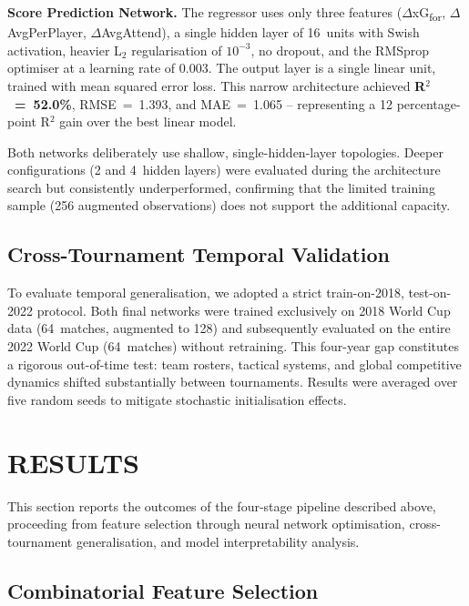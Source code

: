 \documentclass[a4paper,twoside]{article}
\begin{document}
\noindent\textbf{Score Prediction Network.}
The regressor uses only three features ($\Delta$xG\textsubscript{for}, $\Delta$AvgPerPlayer, $\Delta$AvgAttend), a single hidden layer of 16~units with Swish activation, heavier L$_{2}$ regularisation of $10^{-3}$, no dropout, and the RMSprop optimiser at a learning rate of 0.003.
The output layer is a single linear unit, trained with mean squared error loss.
This narrow architecture achieved \textbf{R$^{2}$~=~52.0\%}, RMSE~=~1.393, and MAE~=~1.065 -- representing a 12 percentage-point R$^{2}$ gain over the best linear model.

Both networks deliberately use shallow, single-hidden-layer topologies.
Deeper configurations (2 and 4~hidden layers) were evaluated during the architecture search but consistently underperformed, confirming that the limited training sample (256 augmented observations) does not support the additional capacity.

\subsection{Cross-Tournament Temporal Validation}

To evaluate temporal generalisation, we adopted a strict train-on-2018, test-on-2022 protocol.
Both final networks were trained exclusively on 2018 World Cup data (64~matches, augmented to 128) and subsequently evaluated on the entire 2022 World Cup (64~matches) without retraining.
This four-year gap constitutes a rigorous out-of-time test: team rosters, tactical systems, and global competitive dynamics shifted substantially between tournaments.
Results were averaged over five random seeds to mitigate stochastic initialisation effects.


\section{\uppercase{Results}}
\label{sec:results}

\noindent
This section reports the outcomes of the four-stage pipeline described above, proceeding from feature selection through neural network optimisation, cross-tournament generalisation, and model interpretability analysis.

\subsection{Combinatorial Feature Selection}
\end{document}
